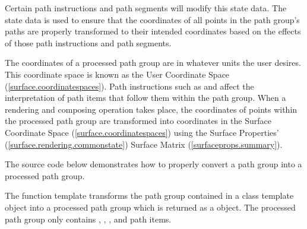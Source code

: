 \pnum
Certain path instructions and path segments will modify this state data. The state data is used to ensure that the coordinates of all points in the path group's paths are properly transformed to their intended coordinates based on the effects of those path instructions and path segments.

\pnum
\enternote
The coordinates of a processed path group are in whatever units the user desires. This coordinate space is known as the User Coordinate Space (\ref{surface.coordinatespaces}). Path instructions such as  and  affect the interpretation of path items that follow them within the path group. When a rendering and composing operation takes place, the coordinates of points within the processed path group are transformed into coordinates in the Surface Coordinate Space (\ref{surface.coordinatespaces}) using the Surface Properties' (\ref{surface.rendering.commonstate}) Surface Matrix (\ref{surfaceprops.summary}).
\exitnote

\pnum
The source code below demonstrates how to properly convert a path group into a processed path group.

\pnum
The  function template transforms the path group contained in a  class template object into a processed path group which is returned as a  object. The processed path group only contains , , , and  path items.



%
%
%
%  
%  
%
%

